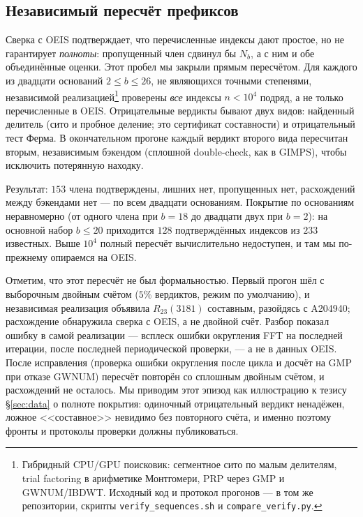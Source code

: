 \documentclass[11pt,a4paper]{article}
\theoremstyle{plain}
\theoremstyle{remark}
\begin{document}
\subsection*{Независимый пересчёт префиксов}

Сверка с OEIS подтверждает, что перечисленные индексы дают простое, но не
гарантирует \emph{полноты}: пропущенный член сдвинул бы $N_b$, а с ним и обе
объединённые оценки. Этот пробел мы закрыли прямым пересчётом. Для каждого из
двадцати оснований $2\le b\le26$, не являющихся точными степенями, независимой
реализацией\footnote{Гибридный CPU/GPU поисковик: сегментное сито по малым
делителям, trial factoring в арифметике Монтгомери, PRP через GMP и GWNUM/IBDWT.
Исходный код и протокол прогонов --- в том же репозитории, скрипты
\texttt{verify\_sequences.sh} и \texttt{compare\_verify.py}.} проверены
\emph{все} индексы $n<10^4$ подряд, а не только перечисленные в OEIS.
Отрицательные вердикты бывают двух видов: найденный делитель (сито и пробное
деление; это сертификат составности) и отрицательный тест Ферма. В окончательном
прогоне каждый вердикт второго вида пересчитан вторым, независимым бэкендом
(сплошной double-check, как в GIMPS), чтобы исключить потерянную находку.

Результат: $153$ члена подтверждены, лишних нет, пропущенных нет, расхождений
между бэкендами нет --- по всем двадцати основаниям. Покрытие по основаниям
неравномерно (от одного члена при $b=18$ до двадцати двух при $b=2$): на
основной набор $b\le20$ приходится $128$ подтверждённых индексов из $233$
известных. Выше $10^4$ полный пересчёт вычислительно недоступен, и там мы
по-прежнему опираемся на OEIS.

Отметим, что этот пересчёт не был формальностью. Первый прогон шёл с выборочным
двойным счётом ($5\%$ вердиктов, режим по умолчанию), и независимая реализация
объявила $R_{23}(3181)$ составным, разойдясь с A204940; расхождение обнаружила сверка
с OEIS, а не двойной счёт. Разбор показал ошибку в самой реализации --- всплеск
ошибки округления FFT на последней итерации, после последней периодической
проверки, --- а не в данных OEIS. После исправления (проверка ошибки округления
после цикла и досчёт на GMP при отказе GWNUM) пересчёт повторён со сплошным двойным
счётом, и расхождений не осталось. Мы приводим этот эпизод как иллюстрацию к тезису
\S\ref{sec:data} о полноте покрытия: одиночный отрицательный вердикт ненадёжен,
ложное <<составное>> невидимо без повторного счёта, и именно поэтому фронты и
протоколы проверки должны публиковаться.
\end{document}
